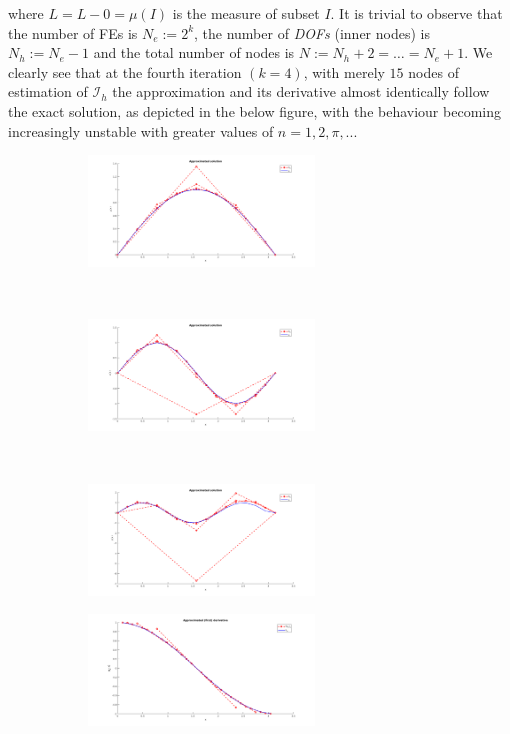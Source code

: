 \documentclass[12pt,openany,twoside,a4paper]{article}
\begin{document}
where $L=L-0=\mu(I)$ is the measure of subset $I$. It is trivial to observe that the number of FEs is $N_e:=2^k$, the number of \textsl{DOFs} (inner nodes) is $N_h := N_e-1$ and the total number of nodes is $N:=N_h+2=\dots=N_e+1$.
\newline We clearly see that at the fourth iteration $(k=4)$, with merely $15$ nodes of estimation of $\mathcal{I}_h$ the approximation and its derivative almost identically follow the exact solution, as depicted in the below figure, with the behaviour becoming increasingly unstable with greater values of $n=1,2,\pi,...$
\begin{figure}[H]
    \begin{subfigure}[h]{0.3\textwidth}
        \includegraphics[keepaspectratio,width=6cm]{sinx.png}
    \end{subfigure}
     ~ \;
     \begin{subfigure}[h]{0.3\textwidth}
        \includegraphics[keepaspectratio,width=6cm]{sin2x.png}
    \end{subfigure}
     ~ \;
     \begin{subfigure}[h]{0.3\textwidth}
        \includegraphics[keepaspectratio,width=6cm]{sinpix.png}
    \end{subfigure}
     \newline
    \begin{subfigure}[h]{0.3\textwidth}
        \includegraphics[keepaspectratio,width=6cm]{cosx.png}

\end{subfigure}
\end{figure}
\end{document}
